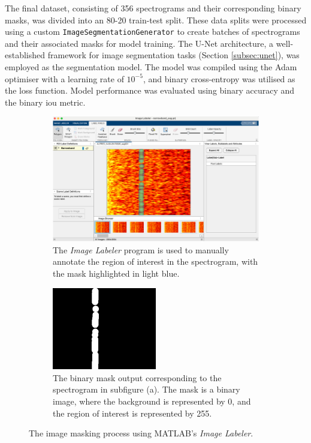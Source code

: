 The final dataset, consisting of 356 spectrograms and their corresponding binary masks, was divided into an 80-20 train-test split. These data splits were processed using a custom \texttt{ImageSegmentationGenerator} to create batches of spectrograms and their associated masks for model training. The U-Net architecture, a well-established framework for image segmentation tasks (Section \ref{subsec:unet}), was employed as the segmentation model. The model was compiled using the Adam optimiser with a learning rate of $10^{-5}$, and binary cross-entropy was utilised as the loss function. Model performance was evaluated using binary accuracy and the binary \acrfull{iou} metric.

\begin{figure}
    \begin{subfigure}{\textwidth}
        \centering
        \includegraphics[width=\textwidth]{img/ch6/masking/matlab_image_labeller.png}
        \caption{The \textit{Image Labeler} program is used to manually annotate the region of interest in the spectrogram, with the mask highlighted in light blue.}
        \label{fig:matlab-image-labeller}
    \end{subfigure}
    
    \vspace{1cm}
    
    \begin{subfigure}{\textwidth}
        \centering
        \includegraphics[width=0.5\textwidth]{img/ch6/masking/binary_mask_ex.png}
        \caption{The binary mask output corresponding to the spectrogram in subfigure (a). The mask is a binary image, where the background is represented by 0, and the region of interest is represented by 255.}
        \label{fig:matlab-image-labeller-result}
    \end{subfigure}
    \caption{The image masking process using MATLAB's \textit{Image Labeler}.}
    \label{}
\end{figure}

